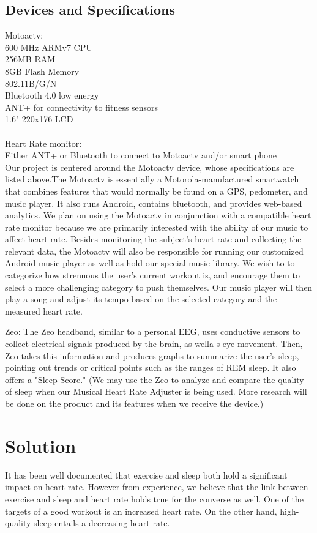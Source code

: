 \documentclass[letterpaper,english]{scrreprt}
\begin{document}
\subsection{Devices and Specifications}
Motoactv:\\
600 MHz ARMv7 CPU\\
256MB RAM\\
8GB Flash Memory\\
802.11B/G/N\\
Bluetooth 4.0 low energy\\
ANT+ for connectivity to fitness sensors\\
1.6" 220x176 LCD\\
\\
Heart Rate monitor:\\
Either ANT+ or Bluetooth to connect to Motoactv and/or smart phone\\

Our project is centered around the Motoactv device, whose specifications are listed above.The Motoactv is essentially a Motorola-manufactured smartwatch that combines features that would normally be found on a GPS, pedometer, and music player. It also runs Android, contains bluetooth, and provides web-based analytics. We plan on using the Motoactv in conjunction with a compatible heart rate monitor because we are primarily interested with the ability of our music to affect heart rate. Besides monitoring the subject's heart rate and collecting the relevant data, the Motoactv will also be responsible for running our customized Android music player as well as hold our special music library. We wish to to categorize how strenuous the user's current workout is, and encourage them to select a more challenging category to push themselves. Our music player will then play a song and adjust its tempo based on the selected category and the measured heart rate.

Zeo:
The Zeo headband, similar to a personal EEG, uses conductive sensors to collect electrical signals produced by the brain, as wella s eye movement. Then, Zeo takes this information and produces graphs to summarize the user's sleep, pointing out trends or critical points such as the ranges of REM sleep. It also offers a "Sleep Score." (We may use the Zeo to analyze and compare the quality of sleep when our Musical Heart Rate Adjuster is being used. More research will be done on the product and its features when we receive the device.)
			 
\section{Solution}
It has been well documented that exercise and sleep both hold a significant impact on heart rate. However from experience, we believe that the link between exercise and sleep and heart rate holds true for the converse as well. One of the targets of a good workout is an increased heart rate. On the other hand, high-quality sleep entails a decreasing heart rate.
			 
\end{document}
